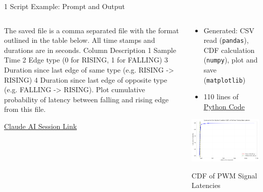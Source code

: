 \documentclass[xcolor={dvipsnames,table}, aspectratio=169]{beamer}
\begin{document}
\begin{frame}[fragile]{1 Script Example: Prompt and Output}
  \begin{columns}
    \begin{column}{0.6\textwidth}
    \begin{promptbox}
      The saved file is a comma separated file with the format outlined in the table below. All time stamps and durations are in seconds. Column Description 1 Sample Time 2 Edge type (0 for RISING, 1 for FALLING) 3 Duration since last edge of same type (e.g. RISING -> RISING) 4 Duration since last edge of opposite type (e.g. FALLING -> RISING). Plot cumulative probability of latency between falling and rising edge from this file.      
    \end{promptbox}
      \small\href{https://claude.ai/share/7e11fde4-bb5e-476e-b8f3-9dad820724f5}{Claude AI Session Link}
    \end{column}
    
    \begin{column}{0.4\textwidth}
      \begin{itemize}
        \item Generated: CSV read (\texttt{pandas}), CDF calculation (\texttt{numpy}), plot and save (\texttt{matplotlib})
        \item 110 lines of \href{https://github.com/neu-ece-esl/ai-prog-workshop/blob/main/1-script/analyze_latency.py}{Python Code}
      \end{itemize}
      \includegraphics[width=\textwidth]{../1-script/pwm_sleep_edges_loaded_latency_cdf.png}
      \small\centerline{CDF of PWM Signal Latencies}
      
    \end{column}
  \end{columns}
\end{frame}
\end{document}
